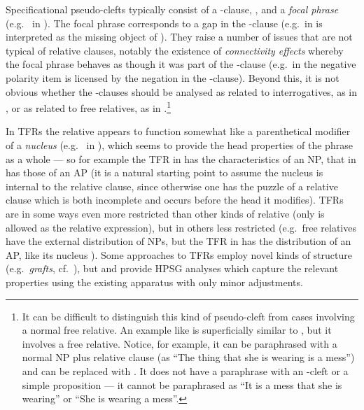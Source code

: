 \documentclass[output=paper
 	        ,biblatex
                ,babelshorthands
                ,newtxmath
                ,draftmode
                ,colorlinks, citecolor=brown
]{langscibook}
\begin{document}
Specificational pseudo-clefts typically consist of a -clause, , and a
\emph{focal phrase} (e.g.\  in ). The focal phrase corresponds to a
gap in the -clause (e.g.\ in   is interpreted as the
missing object of ). They raise a number of issues that are not typical of
relative clauses, notably the existence of \emph{connectivity effects} whereby the focal
phrase behaves as though it was part of the -clause (e.g.\ in  the
negative polarity item  is licensed by the negation in the
-clause). Beyond this, it is not obvious whether the -clauses should be
analysed as related to interrogatives, as in , or as related to free
relatives, as in .\footnote{It can be
  difficult to distinguish this kind 
  of pseudo-cleft from cases involving a normal free relative. An example like  is superficially similar to , but it involves a
  free relative. Notice, for example, it can be paraphrased with a normal NP plus relative
  clause (as ``The thing that she is wearing is a mess'') and  can be replaced
  with . It does not have a paraphrase with an -cleft or a simple
  proposition --- it cannot be paraphrased as ``It is a mess that she is wearing'' or ``She is
  wearing a mess''.}

In TFRs the relative appears to function somewhat like a parenthetical modifier of a
\emph{nucleus} (e.g.\  in ), which seems to provide the head
properties of the phrase as a whole --- so for example the TFR in  has the
characteristics of an NP, that in  has those of an AP (it is a natural starting
point to assume the nucleus is internal to the relative clause, since otherwise one has
the puzzle of a relative clause which is both incomplete and occurs before the head it
modifies). TFRs are in some ways even more restricted than other kinds of relative (only
 is allowed as the relative expression), but in others less restricted (e.g.\
free relatives
have the external distribution of NPs, but the TFR in  has the distribution of
an AP, like its nucleus \lic{belligerent}). Some approaches to TFRs employ novel kinds of
structure (e.g.\ \emph{grafts}, cf.\ \citealt{Riemskijk06Grafts}), but \citet{Yoo:08} and 
\citet{kim2011engtranspfrs} provide HPSG analyses which capture the relevant properties
using the existing apparatus with only minor adjustments.
\end{document}
